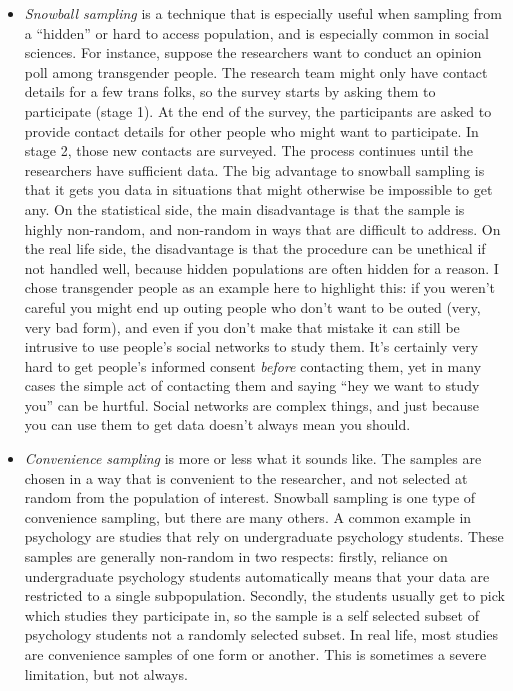 \begin{itemize}
\item {\it Snowball sampling} is a technique that is especially useful when sampling from a ``hidden'' or hard to access population, and is especially common in social sciences. For instance, suppose the researchers want to conduct an opinion poll among transgender people. The research team might only have contact details for a few trans folks, so the survey starts by asking them to participate (stage 1). At the end of the survey, the participants are asked to provide contact details for other people who might want to participate. In stage 2, those new contacts are surveyed. The process continues until the researchers have sufficient data. The big advantage to snowball sampling is that it gets you data in situations that might otherwise be impossible to get any. On the statistical side, the main disadvantage is that the sample is highly non-random, and non-random in ways that are difficult to address. On the real life side, the disadvantage is that the procedure can be unethical if not handled well, because hidden populations are often hidden for a reason. I chose transgender people as an example here to highlight this: if you weren't careful you might end up outing people who don't want to be outed (very, very bad form), and even if you don't make that mistake it can still be intrusive to use people's social networks to study them. It's certainly very hard to get people's informed consent {\it before} contacting them, yet in many cases the simple act of contacting them and saying ``hey we want to study you'' can be hurtful. Social networks are complex things, and just because you can use them to get data doesn't always mean you should.
\item {\it Convenience sampling} is more or less what it sounds like. The samples are chosen in a way that is convenient to the researcher, and not selected at random from the population of interest. Snowball sampling is one type of convenience sampling, but there are many others. A common example in psychology are studies that rely on undergraduate psychology students. These samples are generally non-random in two respects: firstly, reliance on undergraduate psychology students automatically means that your data are restricted to a single subpopulation. Secondly, the students usually get to pick which studies they participate in, so the sample is a self selected subset of psychology students not a randomly selected subset. In real life, most studies are convenience samples of one form or another. This is sometimes a severe limitation, but not always.
\end{itemize}

